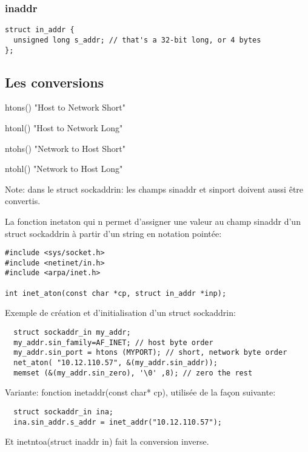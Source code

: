 \documentclass[a4paper]{article}
\begin{document}
\subsubsection{in\textunderscore{}addr}
\begin{lstlisting}
struct in_addr {
  unsigned long s_addr; // that's a 32-bit long, or 4 bytes
};
\end{lstlisting}
\subsection{Les conversions}
\begin{description}
  \item htons() "Host to Network Short"
  \item htonl() "Host to Network Long"
  \item ntohs() "Network to Host Short"
  \item ntohl() "Network to Host Long"
\end{description}
Note: dans le struct sockaddr\textunderscore{}in:\newline
les champs sin\textunderscore{}addr et sin\textunderscore{}port doivent aussi être convertis.\par
La fonction inet\textunderscore{}aton qui n permet d'assigner une valeur au champ sin\textunderscore{}addr d'un struct sockaddr\textunderscore{}in à partir d'un string en notation pointée:
\begin{lstlisting}
#include <sys/socket.h>
#include <netinet/in.h>
#include <arpa/inet.h>

int inet_aton(const char *cp, struct in_addr *inp);
\end{lstlisting}
Exemple de création et d'initialisation d'un struct sockaddr\textunderscore{}in:
\begin{lstlisting}
  struct sockaddr_in my_addr;
  my_addr.sin_family=AF_INET; // host byte order
  my_addr.sin_port = htons (MYPORT); // short, network byte order
  net_aton( "10.12.110.57", &(my_addr.sin_addr));
  memset (&(my_addr.sin_zero), '\0' ,8); // zero the rest
\end{lstlisting}
Variante: fonction inet\textunderscore{}addr(const char* cp), utilisée de la façon suivante:
\begin{lstlisting}
  struct sockaddr_in ina;
  ina.sin_addr.s_addr = inet_addr("10.12.110.57");
\end{lstlisting}
Et inet\textunderscore{}ntoa(struct in\textunderscore{}addr in) fait la conversion inverse.
\end{document}
